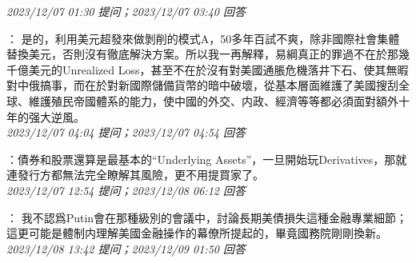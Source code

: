 \documentclass[twocolumn]{ctexart}
\begin{document}
\textit{\hfill\noindent\small 2023/12/07 01:30 提问；2023/12/07 03:40 回答}

：
是的，利用美元超發來做剝削的模式A，50多年百試不爽，除非國際社會集體替換美元，否則沒有徹底解決方案。所以我一再解釋，易綱真正的罪過不在於那幾千億美元的Unrealized Loss，甚至不在於沒有對美國通脹危機落井下石、使其無暇對中俄搞事，而在於對新國際儲備貨幣的暗中破壞，從基本層面維護了美國搜刮全球、維護殖民帝國體系的能力，使中國的外交、内政、經濟等等都必須面對額外十年的强大逆風。
\\

\textit{\hfill\noindent\small 2023/12/07 04:04 提问；2023/12/07 04:54 回答}

：債券和股票還算是最基本的“Underlying Assets”，一旦開始玩Derivatives，那就連發行方都無法完全瞭解其風險，更不用提買家了。
\\

\textit{\hfill\noindent\small 2023/12/07 12:54 提问；2023/12/08 06:12 回答}

：
我不認爲Putin會在那種級別的會議中，討論長期美債損失這種金融專業細節；這更可能是體制内理解美國金融操作的幕僚所提起的，畢竟國務院剛剛換新。
\\

\textit{\hfill\noindent\small 2023/12/08 13:42 提问；2023/12/09 01:50 回答}
\end{document}
